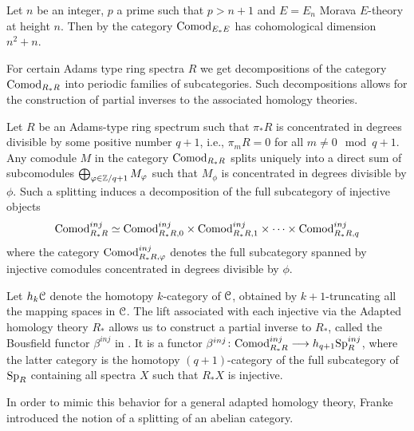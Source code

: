 \begin{example}
    \label{ch2:ex:cohomological-dimension-comodEE}
    Let $n$ be an integer, $p$ a prime such that $p>n+1$ and $E=E_n$ Morava $E$-theory at height $n$. Then by \cite[2.5]{pstragowski_2021} the category $\mathrm{Comod}_{E_*E}$ has cohomological dimension $n^2+n$. 
\end{example}

For certain Adams type ring spectra $R$ we get decompositions of the category $\mathrm{Comod}_{R_*R}$ into periodic families of subcategories. Such decompositions allows for the construction of partial inverses to the associated homology theories. 

\begin{construction}
    \label{ch2:const:splitting-of-comodules}
    Let $R$ be an Adams-type ring spectrum such that $\pi_*R$ is concentrated in degrees divisible by some positive number $q+1$, i.e., $\pi_m R = 0$ for all $m\neq 0 \mod q+1$. Any comodule $M$ in the category $\mathrm{Comod}_{R_*R}$ splits uniquely into a direct sum of subcomodules $\bigoplus_{\varphi \in \mathbb{Z}/q+1} M_\varphi$ such that $M_\phi$ is concentrated in degrees divisible by $\phi$. Such a splitting induces a decomposition of the full subcategory of injective objects 
    $$\mathrm{Comod}_{R_*R}^{inj} \simeq \mathrm{Comod}_{R_*R, 0}^{inj}\times \mathrm{Comod}_{R_*R, 1}^{inj}\times \cdots \times \mathrm{Comod}_{R_*R, q}^{inj}$$ 
    where the category $\mathrm{Comod}_{R_*R, \varphi}^{inj}$ denotes the full subcategory spanned by injective comodules concentrated in degrees divisible by $\phi$. 
    
    Let $h_k \EuScript{C}$ denote the homotopy $k$-category of $\EuScript{C}$, obtained by $k+1$-truncating all the mapping spaces in $\EuScript{C}$.  
    The lift associated with each injective via the Adapted homology theory $R_*$ allows us to construct a partial inverse to $R_*$, called the Bousfield functor $\beta^{inj}$ in \cite{patchkoria-pstragowski_2021}. It is a functor $\beta^{inj}\colon \mathrm{Comod}_{R_*R}^{inj}\longrightarrow h_{q+1} \mathrm{Sp}_R^{inj}$, where the latter category is the homotopy $(q+1)$-category of the full subcategory of $\mathrm{Sp}_R$ containing all spectra $X$ such that $R_*X$ is injective. %
\end{construction}
    
In order to mimic this behavior for a general adapted homology theory, Franke introduced the notion of a splitting of an abelian category. 
    

